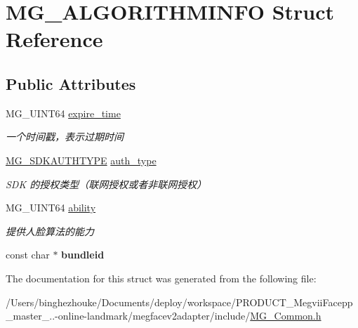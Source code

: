 \hypertarget{struct_m_g___a_l_g_o_r_i_t_h_m_i_n_f_o}{}\section{M\+G\+\_\+\+A\+L\+G\+O\+R\+I\+T\+H\+M\+I\+N\+FO Struct Reference}
\label{struct_m_g___a_l_g_o_r_i_t_h_m_i_n_f_o}
\subsection*{Public Attributes}
\begin{DoxyCompactItemize}
\item 
\mbox{\label{struct_m_g___a_l_g_o_r_i_t_h_m_i_n_f_o_ae83555e95ae8b6390dd8485aec3ad91c}} 
M\+G\+\_\+\+U\+I\+N\+T64 \hyperlink{struct_m_g___a_l_g_o_r_i_t_h_m_i_n_f_o_ae83555e95ae8b6390dd8485aec3ad91c}{expire\+\_\+time}
\begin{DoxyCompactList}\small\item\em 一个时间戳，表示过期时间 \end{DoxyCompactList}\item 
\mbox{\label{struct_m_g___a_l_g_o_r_i_t_h_m_i_n_f_o_a0b212c9a94ccffa74a129d0429950295}} 
\hyperlink{_m_g___common_8h_a3ee48a4a8bc6440c8f21fae5dfcded4c}{M\+G\+\_\+\+S\+D\+K\+A\+U\+T\+H\+T\+Y\+PE} \hyperlink{struct_m_g___a_l_g_o_r_i_t_h_m_i_n_f_o_a0b212c9a94ccffa74a129d0429950295}{auth\+\_\+type}
\begin{DoxyCompactList}\small\item\em S\+DK 的授权类型（联网授权或者非联网授权） \end{DoxyCompactList}\item 
\mbox{\label{struct_m_g___a_l_g_o_r_i_t_h_m_i_n_f_o_a11625766f5876f3f64b74cb209888c63}} 
M\+G\+\_\+\+U\+I\+N\+T64 \hyperlink{struct_m_g___a_l_g_o_r_i_t_h_m_i_n_f_o_a11625766f5876f3f64b74cb209888c63}{ability}
\begin{DoxyCompactList}\small\item\em 提供人脸算法的能力 \end{DoxyCompactList}\item 
\mbox{\label{struct_m_g___a_l_g_o_r_i_t_h_m_i_n_f_o_a9915dccde061cc6e2764a1a42e7a23e6}} 
const char $\ast$ {\bfseries bundleid}
\end{DoxyCompactItemize}


The documentation for this struct was generated from the following file\+:\begin{DoxyCompactItemize}
\item 
/\+Users/binghezhouke/\+Documents/deploy/workspace/\+P\+R\+O\+D\+U\+C\+T\+\_\+\+Megvii\+Facepp\+\_\+master\+\_..-\/online-\/landmark/megfacev2adapter/include/\hyperlink{_m_g___common_8h}{M\+G\+\_\+\+Common.\+h}\end{DoxyCompactItemize}
